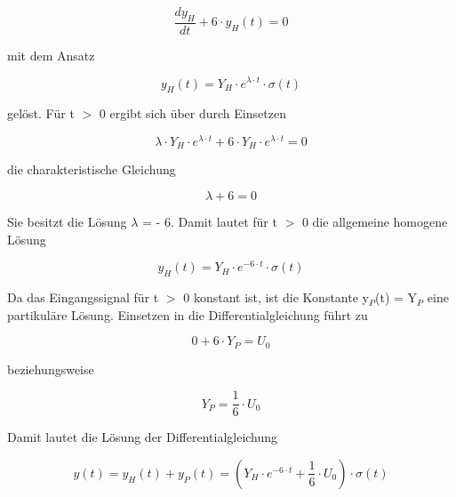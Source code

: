 \begin{equation}\label{eq:ninety}
\frac{dy_{H} }{dt} +6\cdot y_{H} \left(t\right)=0
\end{equation}

\noindent mit dem Ansatz

\begin{equation}\label{eq:ninetyone}
y_{H} \left(t\right)=Y_{H} \cdot e^{\lambda \cdot t} \cdot \sigma \left(t\right)
\end{equation}

\noindent gelöst. Für t $\mathrm{>}$ 0 ergibt sich über durch Einsetzen 

\begin{equation}\label{eq:ninetytwo}
\lambda \cdot Y_{H} \cdot e^{\lambda \cdot t} +6\cdot Y_{H} \cdot e^{\lambda \cdot t} =0
\end{equation}

\noindent die charakteristische Gleichung

\begin{equation}\label{eq:ninetythree}
\lambda +6=0
\end{equation}

\noindent Sie besitzt die Lösung $\lambda$ = - 6. Damit lautet für t $\mathrm{>}$ 0 die allgemeine homogene Lösung

\begin{equation}\label{eq:ninetyfour}
y_{H} \left(t\right)=Y_{H} \cdot e^{-6\cdot t} \cdot \sigma \left(t\right)
\end{equation}

\noindent Da das Eingangssignal für t $\mathrm{>}$ 0 konstant ist, ist die Konstante y${}_{P}$(t) = Y${}_{P}$ eine partikuläre Lösung. Einsetzen in die Differentialgleichung führt zu

\begin{equation}\label{eq:ninetyfive}
0+6\cdot Y_{P} =U_{0} 
\end{equation}

\noindent beziehungsweise

\begin{equation}\label{eq:ninetysix}
Y_{P} =\frac{1}{6} \cdot U_{0}
\end{equation}

\noindent Damit lautet die L\"{o}sung der Differentialgleichung

\begin{equation}\label{eq:ninetyseven}
y\left(t\right)=y_{H} \left(t\right)+y_{P} \left(t\right)=\left(Y_{H} \cdot e^{-6\cdot t} +\frac{1}{6} \cdot U_{0} \right)\cdot \sigma \left(t\right)
\end{equation}


